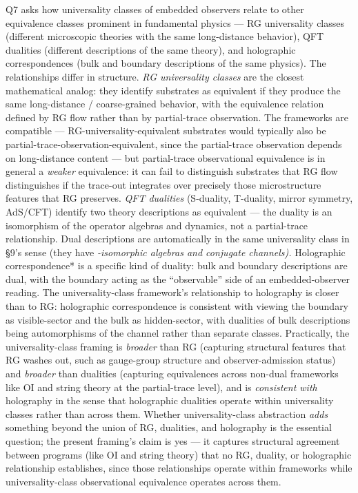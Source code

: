 \documentclass[
]{article}
\begin{document}
Q7 asks how universality classes of embedded observers relate to other
equivalence classes prominent in fundamental physics --- RG universality
classes (different microscopic theories with the same long-distance
behavior), QFT dualities (different descriptions of the same theory),
and holographic correspondences (bulk and boundary descriptions of the
same physics). The relationships differ in structure. \emph{RG
universality classes} are the closest mathematical analog: they identify
substrates as equivalent if they produce the same long-distance /
coarse-grained behavior, with the equivalence relation defined by RG
flow rather than by partial-trace observation. The frameworks are
compatible --- RG-universality-equivalent substrates would typically
also be partial-trace-observation-equivalent, since the partial-trace
observation depends on long-distance content --- but partial-trace
observational equivalence is in general a \emph{weaker} equivalence: it
can fail to distinguish substrates that RG flow distinguishes if the
trace-out integrates over precisely those microstructure features that
RG preserves. \emph{QFT dualities} (S-duality, T-duality, mirror
symmetry, AdS/CFT) identify two theory descriptions as equivalent ---
the duality is an isomorphism of the operator algebras and dynamics, not
a partial-trace relationship. Dual descriptions are automatically in the
same universality class in §9's sense (they have \emph{-isomorphic
algebras and conjugate channels). }Holographic correspondence* is a
specific kind of duality: bulk and boundary descriptions are dual, with
the boundary acting as the ``observable'' side of an embedded-observer
reading. The universality-class framework's relationship to holography
is closer than to RG: holographic correspondence is consistent with
viewing the boundary as visible-sector and the bulk as hidden-sector,
with dualities of bulk descriptions being automorphisms of the channel
rather than separate classes. Practically, the universality-class
framing is \emph{broader} than RG (capturing structural features that RG
washes out, such as gauge-group structure and observer-admission status)
and \emph{broader} than dualities (capturing equivalences across
non-dual frameworks like OI and string theory at the partial-trace
level), and is \emph{consistent with} holography in the sense that
holographic dualities operate within universality classes rather than
across them. Whether universality-class abstraction \emph{adds}
something beyond the union of RG, dualities, and holography is the
essential question; the present framing's claim is yes --- it captures
structural agreement between programs (like OI and string theory) that
no RG, duality, or holographic relationship establishes, since those
relationships operate within frameworks while universality-class
observational equivalence operates across them.
\end{document}
